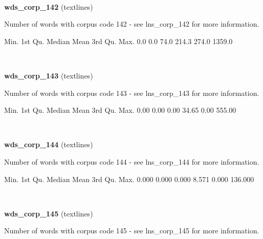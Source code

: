 \documentclass[]{article}
\newenvironment{Shaded}{\begin{snugshade}}{\end{snugshade}}
\newcommand{\FloatTok}[1]{\textcolor[rgb]{0.00,0.00,0.81}{{#1}}}
\newcommand{\NormalTok}[1]{{#1}}
\begin{document}
~

\vspace{1em}

\textbf{wds\_corp\_142} (textlines)

Number of words with corpus code 142 - see lns\_corp\_142 for more
information.

\begin{Shaded}
\begin{Highlighting}[]
   \NormalTok{Min. 1st Qu.  Median    Mean 3rd Qu.    Max. }
    \FloatTok{0.0}     \FloatTok{0.0}    \FloatTok{74.0}   \FloatTok{214.3}   \FloatTok{274.0}  \FloatTok{1359.0} 
\end{Highlighting}
\end{Shaded}

~

\vspace{1em}

\textbf{wds\_corp\_143} (textlines)

Number of words with corpus code 143 - see lns\_corp\_143 for more
information.

\begin{Shaded}
\begin{Highlighting}[]
   \NormalTok{Min. 1st Qu.  Median    Mean 3rd Qu.    Max. }
   \FloatTok{0.00}    \FloatTok{0.00}    \FloatTok{0.00}   \FloatTok{34.65}    \FloatTok{0.00}  \FloatTok{555.00} 
\end{Highlighting}
\end{Shaded}

~

\vspace{1em}

\textbf{wds\_corp\_144} (textlines)

Number of words with corpus code 144 - see lns\_corp\_144 for more
information.

\begin{Shaded}
\begin{Highlighting}[]
   \NormalTok{Min. 1st Qu.  Median    Mean 3rd Qu.    Max. }
  \FloatTok{0.000}   \FloatTok{0.000}   \FloatTok{0.000}   \FloatTok{8.571}   \FloatTok{0.000} \FloatTok{136.000} 
\end{Highlighting}
\end{Shaded}

~

\vspace{1em}

\textbf{wds\_corp\_145} (textlines)

Number of words with corpus code 145 - see lns\_corp\_145 for more
information.
\end{document}

